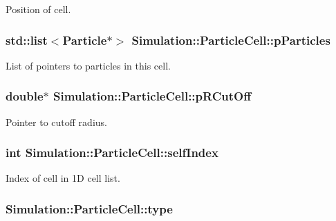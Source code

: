 Position of cell. 

\hypertarget{classSimulation_1_1ParticleCell_adba57fd356e5966d87c181713cf9ca28}{
\subsubsection[{p\-Particles}]{\setlength{\rightskip}{0pt plus 5cm}std\-::list$<${\bf Particle}$\ast$$>$ Simulation\-::\-Particle\-Cell\-::p\-Particles\hspace{0.3cm}{\ttfamily [private]}}}\label{classSimulation_1_1ParticleCell_adba57fd356e5966d87c181713cf9ca28}


List of pointers to particles in this cell. 

\hypertarget{classSimulation_1_1ParticleCell_a5daab4af3ab096dfd7b2de63125ff8b5}{
\subsubsection[{p\-R\-Cut\-Off}]{\setlength{\rightskip}{0pt plus 5cm}double$\ast$ Simulation\-::\-Particle\-Cell\-::p\-R\-Cut\-Off\hspace{0.3cm}{\ttfamily [private]}}}\label{classSimulation_1_1ParticleCell_a5daab4af3ab096dfd7b2de63125ff8b5}


Pointer to cutoff radius. 

\hypertarget{classSimulation_1_1ParticleCell_a9c834e02eef34d364fafd837776bbf23}{
\subsubsection[{self\-Index}]{\setlength{\rightskip}{0pt plus 5cm}int Simulation\-::\-Particle\-Cell\-::self\-Index\hspace{0.3cm}{\ttfamily [private]}}}\label{classSimulation_1_1ParticleCell_a9c834e02eef34d364fafd837776bbf23}


Index of cell in 1\-D cell list. 

\hypertarget{classSimulation_1_1ParticleCell_a4b86c6d459e7cf660b0ff4dbb9796348}{
\subsubsection[{type}]{ Simulation\-::\-Particle\-Cell\-::type\hspace{0.3cm}{\ttfamily [private]}}}\label{classSimulation_1_1ParticleCell_a4b86c6d459e7cf660b0ff4dbb9796348}


